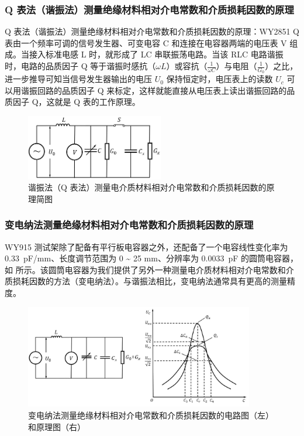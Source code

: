         \subsubsection{Q 表法（谐振法）测量绝缘材料相对介电常数和介质损耗因数的原理}
            Q 表法（谐振法）测量绝缘材料相对介电常数和介质损耗因数的原理：WY2851 Q 表由一个频率可调的信号发生器、可变电容 C 和连接在电容器两端的电压表 V 组成。当接入标准电感 L 时，就形成了 LC 串联振荡电路。当该 RLC 电路谐振时，电路的品质因子 Q 等于谐振时感抗（$\omega L$）或容抗（$\frac{1}{\omega C}$）与电阻（$\frac{1}{G_0}$）之比，进一步推导可知当信号发生器输出的电压 $U_0$ 保持恒定时，电压表上的读数 $U_c$ 可以用谐振回路的品质因子 Q 来标定，这样就能直接从电压表上读出谐振回路的品质因子 Q，这就是 Q 表的工作原理。\par
            \begin{figure}[!ht]\centering
                \includegraphics[width=60mm]{img/A12/fg4.jpg}
                \caption{谐振法（Q 表法）测量电介质材料相对介电常数和介质损耗因数的原理简图\label{fig:A12.4}}
            \end{figure}\par
        \subsubsection{变电纳法测量绝缘材料相对介电常数和介质损耗因数的原理}
            WY915 测试架除了配备有平行板电容器之外，还配备了一个电容线性变化率为 \SI{0.33}{\pico\farad/\milli\metre}、长度调节范围为 0 \~{} 25 \unit{\milli\metre}、分辨率为 \SI{0.0033}{\pico\farad} 的圆筒电容器，如  所示。该圆筒电容器为我们提供了另外一种测量电介质材料相对介电常数和介质损耗因数的方法（变电纳法）。与谐振法相比，变电纳法通常具有更高的测量精度。

        \begin{figure}[!ht]\centering
            \includegraphics[width=100mm]{img/A12/fg5.jpg}
            \caption{变电纳法测量绝缘材料相对介电常数和介质损耗因数的电路图（左）和原理图（右）\label{fig:A12.5}}
        \end{figure}

